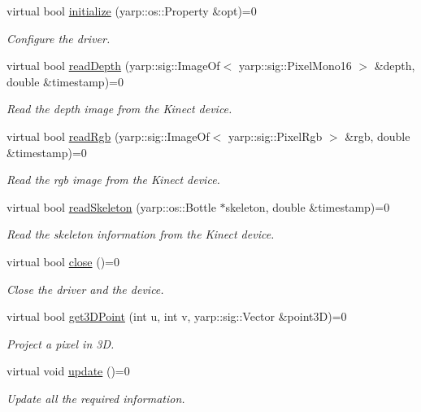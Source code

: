 \begin{DoxyCompactItemize}
\item 
virtual bool \hyperlink{classkinectWrapper_1_1KinectDriver_a4ac34031bd32525a6e3df7e2aa3389e4}{initialize} (yarp\+::os\+::\+Property \&opt)=0
\begin{DoxyCompactList}\small\item\em Configure the driver. \end{DoxyCompactList}\item 
virtual bool \hyperlink{classkinectWrapper_1_1KinectDriver_ac8ecdcb66bce7478113be5bbfdcdc540}{read\+Depth} (yarp\+::sig\+::\+Image\+Of$<$ yarp\+::sig\+::\+Pixel\+Mono16 $>$ \&depth, double \&timestamp)=0
\begin{DoxyCompactList}\small\item\em Read the depth image from the Kinect device. \end{DoxyCompactList}\item 
virtual bool \hyperlink{classkinectWrapper_1_1KinectDriver_a75851d95e5095f28ab1d2f84bb83e8c8}{read\+Rgb} (yarp\+::sig\+::\+Image\+Of$<$ yarp\+::sig\+::\+Pixel\+Rgb $>$ \&rgb, double \&timestamp)=0
\begin{DoxyCompactList}\small\item\em Read the rgb image from the Kinect device. \end{DoxyCompactList}\item 
virtual bool \hyperlink{classkinectWrapper_1_1KinectDriver_a4438aefe634466a180b7e7ffafa4267a}{read\+Skeleton} (yarp\+::os\+::\+Bottle $\ast$skeleton, double \&timestamp)=0
\begin{DoxyCompactList}\small\item\em Read the skeleton information from the Kinect device. \end{DoxyCompactList}\item 
virtual bool \hyperlink{classkinectWrapper_1_1KinectDriver_a1735a23505e5dfbf84ec77fda9c082ba}{close} ()=0
\begin{DoxyCompactList}\small\item\em Close the driver and the device. \end{DoxyCompactList}\item 
virtual bool \hyperlink{classkinectWrapper_1_1KinectDriver_abaf6f40b416f3fc27dec1ea284d3ee5a}{get3\+D\+Point} (int u, int v, yarp\+::sig\+::\+Vector \&point3\+D)=0
\begin{DoxyCompactList}\small\item\em Project a pixel in 3\+D. \end{DoxyCompactList}\item 
virtual void \hyperlink{classkinectWrapper_1_1KinectDriver_acf56a6ba90b6e827390228d313ae1f7a}{update} ()=0\label{classkinectWrapper_1_1KinectDriver_acf56a6ba90b6e827390228d313ae1f7a}

\begin{DoxyCompactList}\small\item\em Update all the required information. \end{DoxyCompactList}\end{DoxyCompactItemize}


